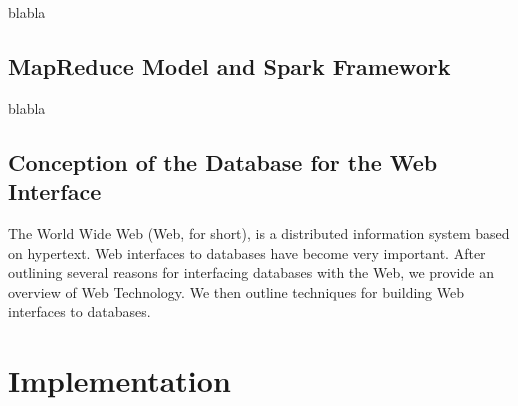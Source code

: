 \documentclass{acmtog} %
\begin{document}
blabla

\subsection{MapReduce Model and Spark Framework}
\label{subsub:mapreduce_spark}

blabla

\subsection{Conception of the Database for the Web Interface}
\label{subsub:conception}

The World Wide Web (Web, for short), is a distributed information system based on hypertext. Web interfaces to databases have become very important. After outlining several reasons for interfacing databases with the Web, we provide an overview of Web Technology. We then outline techniques for building Web interfaces to databases.


\section{Implementation}
\label{sec:implementation}
\end{document}
